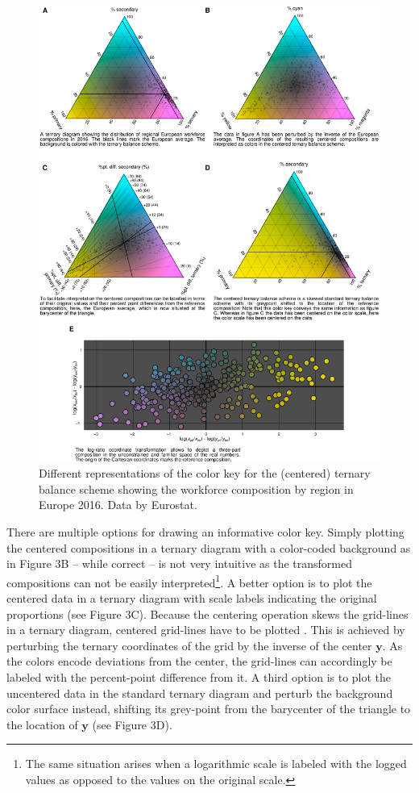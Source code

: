 \documentclass[10pt, twoside, parskip=half]{article}
\makeatletter
\def\maxwidth{\ifdim\Gin@nat@width>\linewidth\linewidth
\else\Gin@nat@width\fi}
\let\Oldincludegraphics\includegraphics
\renewcommand{\includegraphics}[1]{\Oldincludegraphics[width=\maxwidth]{#1}}
\makeatother
\begin{document}
\begin{figure}
\centering
\includegraphics{figure3.png}
\caption{Different representations of the color key for the (centered)
ternary balance scheme showing the workforce composition by region in
Europe 2016. Data by Eurostat.}
\end{figure}

There are multiple options for drawing an informative color key. Simply
plotting the centered compositions in a ternary diagram with a
color-coded background as in Figure 3B -- while correct -- is not very
intuitive as the transformed compositions can not be easily
interpreted\footnote{The same situation arises when a logarithmic scale
  is labeled with the logged values as opposed to the values on the
  original scale.}. A better option is to plot the centered data in a
ternary diagram with scale labels indicating the original proportions
(see Figure 3C). Because the centering operation skews the grid-lines in
a ternary diagram, centered grid-lines have to be plotted
\citep{VonEynatten2002}. This is achieved by perturbing the ternary
coordinates of the grid by the inverse of the center \(\mathbf{y}\). As
the colors encode deviations from the center, the grid-lines can
accordingly be labeled with the percent-point difference from it. A
third option is to plot the uncentered data in the standard ternary
diagram and perturb the background color surface instead, shifting its
grey-point from the barycenter of the triangle to the location of
\(\mathbf{y}\) (see Figure 3D).
\end{document}
